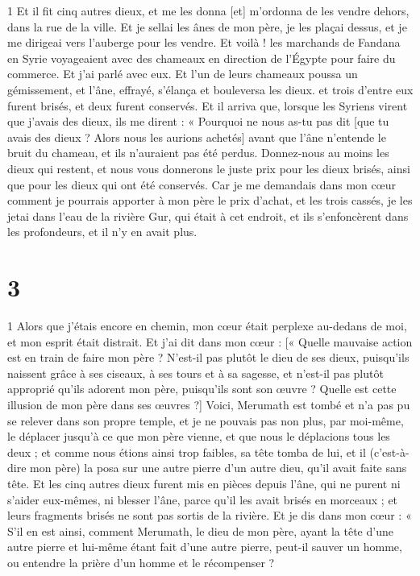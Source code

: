 \par 1 Et il fit cinq autres dieux, et me les donna [et] m'ordonna de les vendre dehors, dans la rue de la ville. Et je sellai les ânes de mon père, je les plaçai dessus, et je me dirigeai vers l'auberge pour les vendre. Et voilà ! les marchands de Fandana en Syrie voyageaient avec des chameaux en direction de l'Égypte pour faire du commerce. Et j'ai parlé avec eux. Et l'un de leurs chameaux poussa un gémissement, et l'âne, effrayé, s'élança et bouleversa les dieux. et trois d'entre eux furent brisés, et deux furent conservés. Et il arriva que, lorsque les Syriens virent que j'avais des dieux, ils me dirent : « Pourquoi ne nous as-tu pas dit [que tu avais des dieux ? Alors nous les aurions achetés] avant que l'âne n'entende le bruit du chameau, et ils n'auraient pas été perdus. Donnez-nous au moins les dieux qui restent, et nous vous donnerons le juste prix pour les dieux brisés, ainsi que pour les dieux qui ont été conservés. Car je me demandais dans mon cœur comment je pourrais apporter à mon père le prix d'achat, et les trois cassés, je les jetai dans l'eau de la rivière Gur, qui était à cet endroit, et ils s'enfoncèrent dans les profondeurs, et il n'y en avait plus.

\chapter{3}

\par 1 Alors que j'étais encore en chemin, mon cœur était perplexe au-dedans de moi, et mon esprit était distrait. Et j’ai dit dans mon cœur : [« Quelle mauvaise action est en train de faire mon père ? N'est-il pas plutôt le dieu de ses dieux, puisqu'ils naissent grâce à ses ciseaux, à ses tours et à sa sagesse, et n'est-il pas plutôt approprié qu'ils adorent mon père, puisqu'ils sont son œuvre ? Quelle est cette illusion de mon père dans ses œuvres ?] Voici, Merumath est tombé et n'a pas pu se relever dans son propre temple, et je ne pouvais pas non plus, par moi-même, le déplacer jusqu'à ce que mon père vienne, et que nous le déplacions tous les deux ; et comme nous étions ainsi trop faibles, sa tête tomba de lui, et il (c'est-à-dire mon père) la posa sur une autre pierre d'un autre dieu, qu'il avait faite sans tête. Et les cinq autres dieux furent mis en pièces depuis l'âne, qui ne purent ni s'aider eux-mêmes, ni blesser l'âne, parce qu'il les avait brisés en morceaux ; et leurs fragments brisés ne sont pas sortis de la rivière. Et je dis dans mon cœur : « S'il en est ainsi, comment Merumath, le dieu de mon père, ayant la tête d'une autre pierre et lui-même étant fait d'une autre pierre, peut-il sauver un homme, ou entendre la prière d'un homme et le récompenser ?

